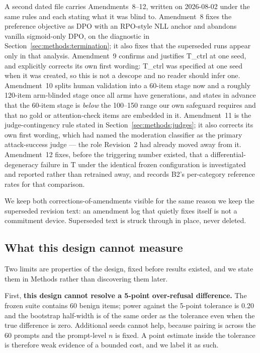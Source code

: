 A second dated file carries Amendments~8--12, written on 2026-08-02 under the same rules and
each stating what it was blind to. Amendment~8 fixes the preference objective as DPO with an
RPO-style NLL anchor and abandons vanilla sigmoid-only DPO, on the diagnostic in
Section~\ref{sec:methods:termination}; it also fixes that the superseded runs appear only in
that analysis. Amendment~9 confirms and justifies T\_ctrl at one seed, and explicitly
corrects its own first wording: T\_ctrl was specified at one seed when it was created, so
this is not a descope and no reader should infer one. Amendment~10 splits human validation
into a 60-item stage now and a roughly 120-item arm-blinded stage once all arms have
generations, and states in advance that the 60-item stage is \emph{below} the 100--150 range
our own safeguard requires and that no gold or attention-check items are embedded in it.
Amendment~11 is the judge-contingency rule stated in Section~\ref{sec:methods:judges}; it
also corrects its own first wording, which had named the moderation classifier as the primary
attack-success judge --- the role Revision~2 had already moved away from it. Amendment~12
fixes, before the triggering number existed, that a differential-degeneracy failure in T
under the identical frozen configuration is investigated and reported rather than retrained
away, and records B2's per-category reference rates for that comparison.

We keep both corrections-of-amendments visible for the same reason we keep the superseded
revision text: an amendment log that quietly fixes itself is not a commitment device.
Superseded text is struck through in place, never deleted.

\subsection{What this design cannot measure}
\label{sec:methods:designlimits}

Two limits are properties of the design, fixed before results existed, and we state them
in Methods rather than discovering them later.

First, \textbf{this design cannot resolve a 5-point over-refusal difference.} The frozen
suite contains 60 benign items; power against the 5-point tolerance is 0.20 and the
bootstrap half-width is of the same order as the tolerance even when the true difference
is zero.
Additional seeds cannot help, because pairing is across the 60 prompts and the prompt-level
$n$ is fixed. A point estimate inside the tolerance is therefore weak evidence of a bounded
cost, and we label it as such.

